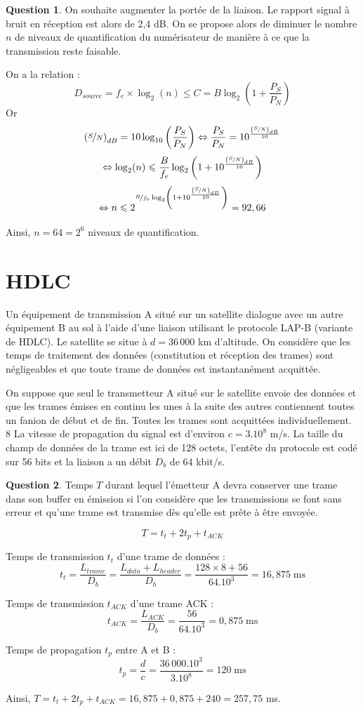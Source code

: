 \documentclass[11pt,english,french]{scrreprt}
\theoremstyle{remark}
\theoremstyle{definition}
\newtheorem{ques}{Question}[section]
\begin{document}
\begin{ques}
	On souhaite augmenter la portée de la liaison. Le rapport signal à bruit en réception est alors de 2,4 dB. On se propose alors de diminuer le nombre $n$ de niveaux de quantification du numérisateur de manière à ce que la transmission reste faisable.
	
	On a la relation :\[D_{source} =f_e\times \log_2(n)\leqslant C=B\log_2\left(1+\frac{P_S}{P_N}\right)\]
	Or \[\left(\nicefrac{S}{N}\right)_{dB}=10\log_{10}\left(\frac{P_S}{P_N}\right)\Leftrightarrow\frac{P_S}{P_N}=10^{\frac{\left(\nicefrac{S}{N}\right)_{dB}}{10}}\]
	\[\Leftrightarrow \log_2(n)\leqslant \frac{B}{f_e}\log_2\left(1+10^{\frac{\left(\nicefrac{S}{N}\right)_{dB}}{10}}\right)\]
	\[\Leftrightarrow n\leqslant 2^{\nicefrac{B}{f_e}\log_2\left(1+10^{\frac{\left(\nicefrac{S}{N}\right)_{dB}}{10}}\right)} = 92,66\]
	
	Ainsi, $n=64=2^6$ niveaux de quantification.
\end{ques}

\clearpage

\section{HDLC} %

Un équipement de transmission A situé sur un satellite dialogue avec un autre équipement B au sol à l’aide d’une liaison utilisant le protocole LAP-B (variante de HDLC). Le satellite se situe à $d = 36\,000$ km d’altitude. On considère que les temps de traitement des données (constitution et réception des trames) sont négligeables et que toute trame de données est instantanément acquittée.

On suppose que seul le transmetteur A situé sur le satellite envoie des données et que les trames émises en continu les unes à la suite des autres contiennent toutes un fanion de début et de fin. Toutes les trames sont acquittées individuellement.	8 La vitesse de propagation du signal est d’environ $c = 3.10^8$ m/s. La taille du champ de données de la trame est ici de 128 octets, l’entête du protocole est codé sur 56 bits et la liaison a un débit $D_b$ de 64 kbit/s.

\begin{ques}
	Temps $T$ durant lequel l'émetteur A devra conserver une trame dans son buffer en émission si l’on considère que les transmissions se font sans erreur et qu’une trame est transmise dès qu’elle est prête à être envoyée.
	
	\[T = t_t + 2t_p + t_{ACK}\]
	
	Temps de transmission $t_t$ d'une trame de données :\[t_t = \frac{L_{trame}}{D_b} = \frac{L_{data}+L_{header}}{D_b} = \frac{128\times 8+56}{64.10^3} = 16,875\;\textrm{ms}\]
	
	Temps de transmission $t_{ACK}$ d'une trame ACK :\[t_{ACK} = \frac{L_{ACK}}{D_b} = \frac{56}{64.10^3} = 0,875\;\textrm{ms}\]
	
	Temps de propagation $t_p$ entre A et B : \[t_p = \frac{d}{c} = \frac{36\,000.10^3}{3.10^8} = 120\;\textrm{ms}\]
	
	Ainsi, $T = t_t + 2t_p + t_{ACK} = 16,875 + 0,875 + 240 = 257,75$ ms.
\end{ques}
\end{document}
